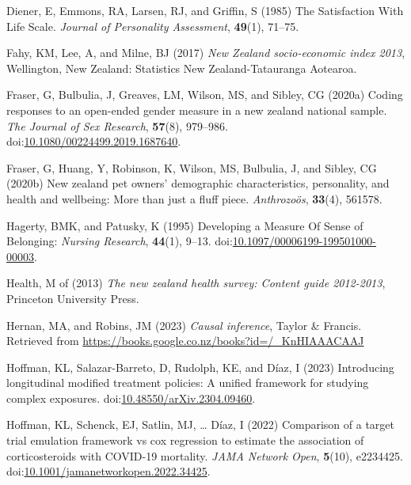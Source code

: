 \documentclass[
  singlecolumn,
  9pt]{article}
\newlength{\cslhangindent}
\newenvironment{CSLReferences}[2] %
 {\begin{list}{}{%
  \setlength{\itemindent}{0pt}
  \setlength{\leftmargin}{0pt}
  \setlength{\parsep}{0pt}
  \ifodd #1
   \setlength{\leftmargin}{\cslhangindent}
   \setlength{\itemindent}{-1\cslhangindent}
  \fi
  \setlength{\itemsep}{#2\baselineskip}}}
 {\end{list}}
\begin{document}
\begin{CSLReferences}{1}{0}
Diener, E, Emmons, RA, Larsen, RJ, and Griffin, S (1985) The
Satisfaction With Life Scale. \emph{Journal of Personality Assessment},
\textbf{49}(1), 71--75.

Fahy, KM, Lee, A, and Milne, BJ (2017) \emph{New Zealand socio-economic
index 2013}, Wellington, New Zealand: Statistics New Zealand-Tatauranga
Aotearoa.

Fraser, G, Bulbulia, J, Greaves, LM, Wilson, MS, and Sibley, CG (2020a)
Coding responses to an open-ended gender measure in a new zealand
national sample. \emph{The Journal of Sex Research}, \textbf{57}(8),
979--986.
doi:\href{https://doi.org/10.1080/00224499.2019.1687640}{10.1080/00224499.2019.1687640}.

Fraser, G, Huang, Y, Robinson, K, Wilson, MS, Bulbulia, J, and Sibley,
CG (2020b) New zealand pet owners{'} demographic characteristics,
personality, and health and wellbeing: More than just a fluff piece.
\emph{Anthrozoös}, \textbf{33}(4), 561578.

Hagerty, BMK, and Patusky, K (1995) Developing a Measure Of Sense of
Belonging: \emph{Nursing Research}, \textbf{44}(1), 9--13.
doi:\href{https://doi.org/10.1097/00006199-199501000-00003}{10.1097/00006199-199501000-00003}.

Health, M of (2013) \emph{The new zealand health survey: Content guide
2012-2013}, Princeton University Press.

Hernan, MA, and Robins, JM (2023) \emph{Causal inference}, Taylor \&
Francis. Retrieved from
\url{https://books.google.co.nz/books?id=/_KnHIAAACAAJ}

Hoffman, KL, Salazar-Barreto, D, Rudolph, KE, and Díaz, I (2023)
Introducing longitudinal modified treatment policies: A unified
framework for studying complex exposures.
doi:\href{https://doi.org/10.48550/arXiv.2304.09460}{10.48550/arXiv.2304.09460}.

Hoffman, KL, Schenck, EJ, Satlin, MJ, \ldots{} Díaz, I (2022) Comparison
of a target trial emulation framework vs cox regression to estimate the
association of corticosteroids with COVID-19 mortality. \emph{JAMA
Network Open}, \textbf{5}(10), e2234425.
doi:\href{https://doi.org/10.1001/jamanetworkopen.2022.34425}{10.1001/jamanetworkopen.2022.34425}.


\end{CSLReferences}
\end{document}

